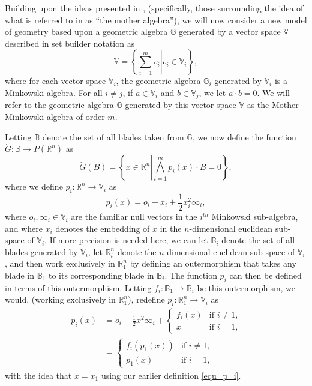 \documentclass{birkjour}
\theoremstyle{definition}
\theoremstyle{remark}
\numberwithin{equation}{section}
\newcommand{\R}{\mathbb{R}}
\newcommand{\B}{\mathbb{B}}
\newcommand{\G}{\mathbb{G}}
\newcommand{\V}{\mathbb{V}}
\newcommand{\Gd}{\dot{G}}
\newcommand{\nvai}{\infty}
\newcommand{\nvao}{o}
\begin{document}
Building upon the ideas presented in \cite{DoranHestenes93}, (specifically,
those surrounding the idea of what is referred to in \cite{DoranHestenes93}
as ``the mother algebra''), we will now consider
a new model of geometry based upon a geometric algebra $\G$
generated by a vector space $\V$ described in set builder notation as
\begin{equation*}
\V = \left\{\left.\sum_{i=1}^m v_i\right|v_i\in\V_i\right\},
\end{equation*}
where for each vector space $\V_i$, the geometric algebra $\G_i$ generated by $\V_i$
is a Minkowski algebra.  For all $i\neq j$, if $a\in\V_i$
and $b\in\V_j$, we let $a\cdot b=0$.  We will refer to the geometric algebra $\G$
generated by this vector space $\V$ as the Mother Minkowski algebra of order $m$.

Letting $\B$ denote the set
of all blades taken from $\G$, we now define the function $\Gd:\B\to P(\R^n)$ as
\begin{equation}\label{equ_Gd}
\Gd(B) = \left\{x\in\R^n\left|\bigwedge_{i=1}^m p_i(x)\cdot B=0\right\}\right.,
\end{equation}
where we define $p_i:\R^n\to\V_i$ as
\begin{equation}\label{equ_p_i}
p_i(x) = \nvao_i + x_i + \frac{1}{2}x_i^2\nvai_i,
\end{equation}
where $\nvao_i,\nvai_i\in\V_i$ are the familiar null vectors in the $i^{th}$ Minkowski sub-algebra,
and where $x_i$ denotes the embedding
of $x$ in the $n$-dimensional euclidean sub-space of $\V_i$.  If more precision is needed here,
we can let $\B_i$ denote the set of all blades generated by $\V_i$,
let $\R_i^n$ denote the $n$-dimensional euclidean sub-space of $\V_i$, and then
work exclusively in $\R_1^n$ by defining an outermorphism that takes any blade in $\B_1$
to its corresponding blade in $\B_i$.  The function $p_i$ can then be defined in terms
of this outermorphism.  Letting $f_i:\B_1\to\B_i$ be this outermorphism,
we would, (working exclusively in $\R_1^n$), redefine $p_i:\R_1^n\to\V_i$ as
\begin{align*}
p_i(x) &= \nvao_i + \frac{1}{2}x^2\nvai_i + \left\{\begin{array}{ll}
f_i(x) & \mbox{if $i\neq 1$,} \\
x & \mbox{if $i = 1$,}
\end{array}\right. \\
&= \left\{\begin{array}{ll}
f_i(p_1(x)) & \mbox{if $i\neq 1$,} \\
p_1(x) & \mbox{if $i=1$,}
\end{array}\right.
\end{align*}
with the idea that $x=x_1$ using our earlier definition \eqref{equ_p_i}.
\end{document}
